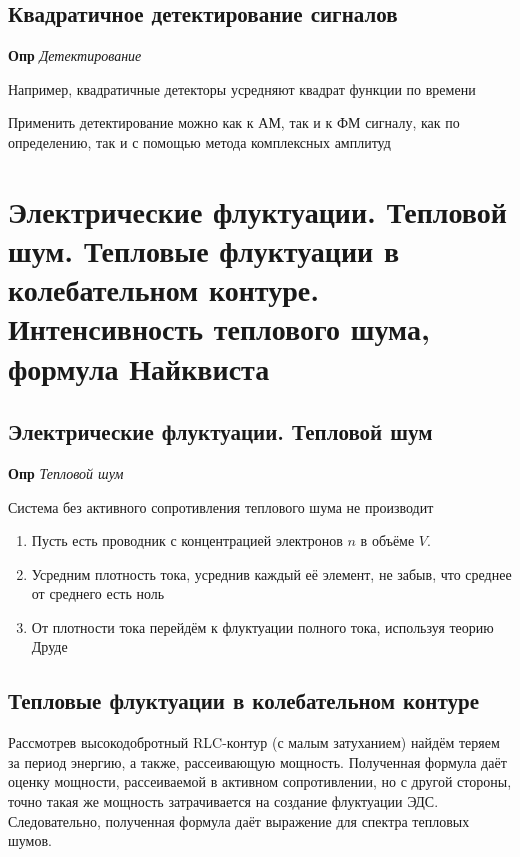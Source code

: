 \documentclass[a4paper, 14pt]{article}
\begin{document}
    \subsection{Квадратичное детектирование сигналов}
    
    \textbf{Опр} \textit{Детектирование}
    
    Например, квадратичные детекторы усредняют квадрат функции по времени
    
    Применить детектирование можно как к АМ, так и к ФМ сигналу, как по определению, так и с помощью метода
    комплексных амплитуд
    
    \section{Электрические флуктуации.
    Тепловой шум.
    Тепловые флуктуации в колебательном контуре.
    Интенсивность теплового шума, формула Найквиста}
    
    \subsection{Электрические флуктуации. Тепловой шум}
    
    \textbf{Опр} \textit{Тепловой шум}
    
    Система без активного сопротивления теплового шума не производит
    
    \begin{enumerate}
        \item Пусть есть проводник с концентрацией электронов $n$ в объёме $V$.
        \item Усредним плотность тока, усреднив каждый её элемент, не забыв, что среднее от среднего есть ноль
        \item От плотности тока перейдём к флуктуации полного тока, используя теорию Друде
    \end{enumerate}
    
    \subsection{Тепловые флуктуации в колебательном контуре}
    
    Рассмотрев высокодобротный RLC-контур (с малым затуханием) найдём теряем за период энергию, а также, рассеивающую
    мощность.
    Полученная формула даёт оценку мощности, рассеиваемой в активном сопротивлении, но с другой стороны, точно такая
    же мощность затрачивается на создание флуктуации ЭДС.
    Следовательно, полученная формула даёт выражение для спектра тепловых шумов.
    
\end{document}
